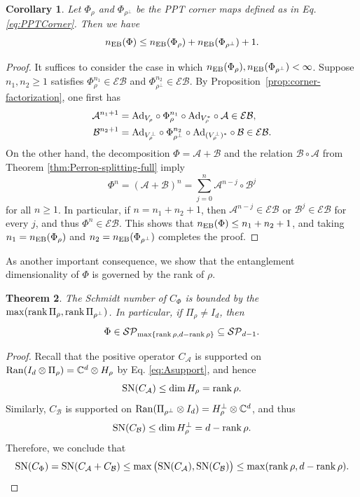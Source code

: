 \documentclass[11pt,reqno]{amsart}
\newtheorem{theorem}{Theorem}[section]
\newtheorem{corollary}[theorem]{Corollary}
\theoremstyle{definition}
\theoremstyle{definition}
\theoremstyle{definition}
\theoremstyle{definition}
\newcommand{\A}{\mathcal{A}}
\newcommand{\B}{\mathcal{B}}
\newcommand{\Comp}{\mathbb{C}}
\newcommand{\SN}{{\rm SN}}
\newcommand{\SP}{\mathcal{SP}}
\newcommand{\EB}{\mathcal{EB}}
\newcommand{\Ad}{{\rm Ad}}
\begin{document}
\begin{corollary}
\label{cor:recursive-EB-bound}
Let
$\Phi_{\rho}$ and $\Phi_{\rho^{\perp}}$ be the PPT corner maps defined as in Eq. \eqref{eq:PPTCorner}. Then we have
    $$n_{\rm EB}(\Phi) \leq n_{\rm EB}(\Phi_{\rho})+n_{\rm EB}(\Phi_{\rho^{\perp}})+1.$$
\end{corollary}
\begin{proof}
It suffices to consider the case in which $n_{\rm EB}(\Phi_{\rho}), n_{\rm EB}(\Phi_{\rho^{\perp}})<\infty$. Suppose $n_1,n_2\geq 1$ satisfies $\Phi_{\rho}^{n_1}\in \EB$ and $\Phi_{\rho^{\perp}}^{n_2}\in \EB$.
By Proposition~\ref{prop:corner-factorization}, one first has
\begin{align*}
    \A^{n_1+1} &=\Ad_{V_{\rho}}\circ\Phi_{\rho}^{n_1}\circ \Ad_{V_{\rho}^*}\circ \A\in \EB,\\
    \B^{n_2+1} &=\Ad_{V_{\rho}^{\perp}}\circ\Phi_{\rho^{\perp}}^{n_2}\circ\Ad_{(V_{\rho}^{\perp})^*} \circ \B \in \EB.
\end{align*}
On the other hand, the decomposition $\Phi=\A+\B$ and the relation $\B\circ \A$ from Theorem \ref{thm:Perron-splitting-full} imply
    $$\Phi^n = (\A+\B)^n = \sum_{j=0}^n \A^{n-j}\circ \B^j$$
for all $n\geq 1$. In particular, if $n=n_1+n_2+1$, then $\A^{n-j}\in \EB$ or $\B^{j}\in \EB$ for every $j$, and thus $\Phi^n\in \EB$. This shows that $n_{\rm EB}(\Phi)\leq n_1+n_2+1$, and taking $n_1=n_{\rm EB}(\Phi_{\rho})$ and $n_2=n_{\rm EB}(\Phi_{\rho^{\perp}})$ completes the proof.
\end{proof}

As another important consequence, we show that the entanglement dimensionality of $\Phi$ is governed by the rank of $\rho$.

\begin{theorem}
\label{thm:singular-support-SP}
The Schmidt number of $C_{\Phi}$ is bounded by the $\max(\rank \Pi_{\rho}, \rank \Pi_{\rho^{\perp}})$. In particular, if $\Pi_{\rho}\neq I_d$, then
    $$\Phi\in\SP_{\max\{\rank \rho, d-\rank \rho\}}
 \subseteq\SP_{d-1}.$$
\end{theorem}

\begin{proof}
Recall that the positive operator
$C_{\A}$ is supported on ${\rm Ran}(I_d\otimes \Pi_{\rho}) = \Comp^d\otimes H_{\rho}$ by Eq. \eqref{eq:Asupport}, and hence 
    $$\SN(C_{\A})\leq \dim H_{\rho} = \rank \rho.$$
Similarly, $C_{\B}$ is supported on ${\rm Ran}(\Pi_{\rho^{\perp}}\otimes I_d) = H_{\rho}^{\perp}\otimes \Comp^d$, and thus
    $$\SN(C_{\B})\leq \dim H_{\rho}^{\perp} = d-\rank \rho.$$
Therefore, we conclude that
    $$\SN(C_{\Phi}) = \SN(C_{\A}+C_{\B}) \leq \max \big(\SN(C_{\A}), \SN(C_{\B})\big) \leq \max (\rank \rho, d-\rank \rho).$$
\end{proof}
\end{document}
